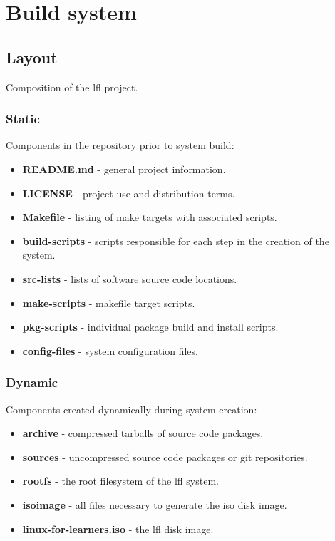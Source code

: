 \section{Build system}\label{Build system}

\subsection{Layout}

Composition of the \gls{lfl} project.

\subsubsection{Static}

Components in the repository prior to system build:

\begin{itemize}
    \item \textbf{README.md} - general project information.
    \item \textbf{LICENSE} - project use and distribution terms.
    \item \textbf{Makefile} - listing of make targets with associated scripts.
    \item \textbf{build-scripts} - scripts responsible for each step in the creation of the system.
    \item \textbf{src-lists} - lists of software source code locations.
    \item \textbf{make-scripts} - makefile target scripts.
    \item \textbf{pkg-scripts} - individual package build and install scripts.
    \item \textbf{config-files} - system configuration files.
\end{itemize}

\subsubsection{Dynamic}

Components created dynamically during system creation:

\begin{itemize}
    \item \textbf{archive} - compressed tarballs of source code packages.
    \item \textbf{sources} - uncompressed source code packages or git repositories.
    \item \textbf{rootfs} - the root filesystem of the \gls{lfl} system.
    \item \textbf{isoimage} - all files necessary to generate the iso disk image.
    \item \textbf{linux-for-learners.iso} - the \gls{lfl} disk image.
\end{itemize}

